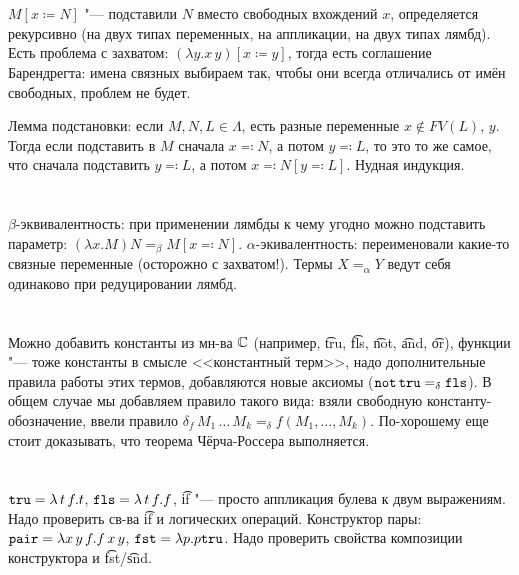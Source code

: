 \TODO

\section{} %
$M[x \coloneq N]$ "--- подставили $N$ вместо свободных вхождений $x$,
определяется рекурсивно (на двух типах переменных, на аппликации, на двух типах лямбд).
Есть проблема с захватом: $(\lambda y. x\, y)[x \coloneq y]$, тогда есть соглашение
Барендрегта: имена связных выбираем так, чтобы они всегда отличались от имён свободных,
проблем не будет.

Лемма подстановки: если $M, N, L \in \Lambda$, есть разные переменные $x \notin FV(L)$, $y$.
Тогда если подставить в $M$ сначала $x\eqcolon N$, а потом $y \eqcolon L$, то это
то же самое, что сначала подставить $y \eqcolon L$, а потом $x\eqcolon N[y\eqcolon L]$.
Нудная индукция.

\TODO

\section{} %
$\beta$-эквивалентность: при применении лямбды к чему угодно можно подставить параметр:
$(\lambda x . M)N =_\beta M[x\eqcolon N]$.
$\alpha$-экивалентность: переименовали какие-то связные переменные (осторожно с захватом!).
Термы $X=_\alpha Y$ ведут себя одинаково при редуцировании лямбд.

\TODO

\section{} %
Можно добавить константы из мн-ва $\mathbb{C}$ (например, \t{tru}, \t{fls}, \t{not}, \t{and}, \t{or}),
функции "--- тоже константы в смысле <<константный терм>>,
надо дополнительные правила работы этих термов, добавляются новые аксиомы ($\texttt{not}\,\texttt{tru}=_\delta \texttt{fls}$).
В общем случае мы добавляем правило такого вида: взяли свободную константу-обозначение,
ввели правило $\delta_f\,M_1\,\dots\,M_k =_\delta f(M_1, \dots, M_k)$.
По-хорошему еще стоит доказывать, что теорема Чёрча-Россера выполняется.

\TODO

\section{} %
$\texttt{tru} = \lambda\,t\,f.t$, $\texttt{fls} = \lambda\,t\,f.f$,
\t{if} "--- просто аппликация булева к двум выражениям.
Надо проверить св-ва \t{if} и логических операций.
Конструктор пары: $\texttt{pair} = \lambda x\,y\,f.f\,x\,y$, $\texttt{fst}=\lambda p.p \texttt{tru}$.
Надо проверить свойства композиции конструктора и \t{fst}/\t{snd}.

